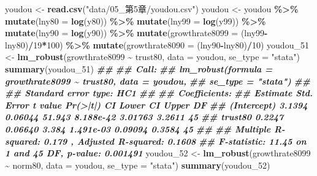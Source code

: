 \documentclass[
]{book}
\newenvironment{Shaded}{\begin{snugshade}}{\end{snugshade}}
\newcommand{\AttributeTok}[1]{\textcolor[rgb]{0.13,0.29,0.53}{#1}}
\newcommand{\DecValTok}[1]{\textcolor[rgb]{0.00,0.00,0.81}{#1}}
\newcommand{\DocumentationTok}[1]{\textcolor[rgb]{0.56,0.35,0.01}{\textbf{\textit{#1}}}}
\newcommand{\FunctionTok}[1]{\textcolor[rgb]{0.13,0.29,0.53}{\textbf{#1}}}
\newcommand{\NormalTok}[1]{#1}
\newcommand{\OtherTok}[1]{\textcolor[rgb]{0.56,0.35,0.01}{#1}}
\newcommand{\SpecialCharTok}[1]{\textcolor[rgb]{0.81,0.36,0.00}{\textbf{#1}}}
\newcommand{\StringTok}[1]{\textcolor[rgb]{0.31,0.60,0.02}{#1}}
\begin{document}
\begin{Shaded}
\begin{Highlighting}[]
\NormalTok{youdou }\OtherTok{\textless{}{-}} \FunctionTok{read.csv}\NormalTok{(}\StringTok{"data/05\_第5章/youdou.csv"}\NormalTok{)}
\NormalTok{youdou }\OtherTok{\textless{}{-}}\NormalTok{ youdou }\SpecialCharTok{\%\textgreater{}\%}
    \FunctionTok{mutate}\NormalTok{(}\AttributeTok{lny80 =} \FunctionTok{log}\NormalTok{(y80)) }\SpecialCharTok{\%\textgreater{}\%}
    \FunctionTok{mutate}\NormalTok{(}\AttributeTok{lny99 =} \FunctionTok{log}\NormalTok{(y99)) }\SpecialCharTok{\%\textgreater{}\%}
    \FunctionTok{mutate}\NormalTok{(}\AttributeTok{lny90 =} \FunctionTok{log}\NormalTok{(y90)) }\SpecialCharTok{\%\textgreater{}\%}
    \FunctionTok{mutate}\NormalTok{(}\AttributeTok{growthrate8099 =}\NormalTok{ (lny99}\SpecialCharTok{{-}}\NormalTok{lny80)}\SpecialCharTok{/}\DecValTok{19}\SpecialCharTok{*}\DecValTok{100}\NormalTok{) }\SpecialCharTok{\%\textgreater{}\%}
    \FunctionTok{mutate}\NormalTok{(}\AttributeTok{growthrate8090 =}\NormalTok{ (lny90}\SpecialCharTok{{-}}\NormalTok{lny80)}\SpecialCharTok{/}\DecValTok{10}\NormalTok{)}
\NormalTok{youdou\_51 }\OtherTok{\textless{}{-}} \FunctionTok{lm\_robust}\NormalTok{(growthrate8099 }\SpecialCharTok{\textasciitilde{}}\NormalTok{ trust80, }\AttributeTok{data =}\NormalTok{ youdou, }\AttributeTok{se\_type =} \StringTok{"stata"}\NormalTok{)}
\FunctionTok{summary}\NormalTok{(youdou\_51)}
\DocumentationTok{\#\# }
\DocumentationTok{\#\# Call:}
\DocumentationTok{\#\# lm\_robust(formula = growthrate8099 \textasciitilde{} trust80, data = youdou, }
\DocumentationTok{\#\#     se\_type = "stata")}
\DocumentationTok{\#\# }
\DocumentationTok{\#\# Standard error type:  HC1 }
\DocumentationTok{\#\# }
\DocumentationTok{\#\# Coefficients:}
\DocumentationTok{\#\#             Estimate Std. Error t value  Pr(\textgreater{}|t|) CI Lower CI Upper DF}
\DocumentationTok{\#\# (Intercept)   3.1394    0.06044  51.943 8.188e{-}42  3.01763   3.2611 45}
\DocumentationTok{\#\# trust80       0.2247    0.06640   3.384 1.491e{-}03  0.09094   0.3584 45}
\DocumentationTok{\#\# }
\DocumentationTok{\#\# Multiple R{-}squared:  0.179 , Adjusted R{-}squared:  0.1608 }
\DocumentationTok{\#\# F{-}statistic: 11.45 on 1 and 45 DF,  p{-}value: 0.001491}
\NormalTok{youdou\_52 }\OtherTok{\textless{}{-}} \FunctionTok{lm\_robust}\NormalTok{(growthrate8099 }\SpecialCharTok{\textasciitilde{}}\NormalTok{ norm80, }\AttributeTok{data =}\NormalTok{ youdou, }\AttributeTok{se\_type =} \StringTok{"stata"}\NormalTok{)}
\FunctionTok{summary}\NormalTok{(youdou\_52)}

\end{Highlighting}
\end{Shaded}
\end{document}
